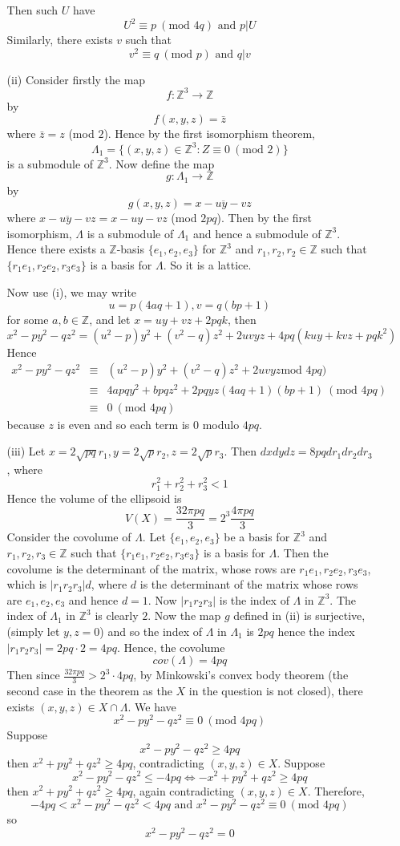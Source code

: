 \begin{enumerate}
\begin{enumerate}
    Then such $U$ have
    $$U^2 \equiv p~(\text{mod }4q) \text{ and } p|U$$
    Similarly, there exists $v$ such that
    $$v^2 \equiv q~(\text{mod } p) \text{ and } q|v$$
\item[(ii)] Consider firstly the map
$$f:\mathbb{Z}^3 \rightarrow \mathbb{Z}$$
by
$$f(x,y,z)=\bar{z}$$
where $\bar{z}= z$ (mod $2$). Hence by the first isomorphism theorem,
$$\Lambda_1=\{(x,y,z)\in \mathbb{Z}^3: Z \equiv 0~(\text{mod }2)\}$$ is
a submodule of $\mathbb{Z}^3$.
Now define the map
$$g:\Lambda_1 \rightarrow \mathbb{Z}$$
by
$$g(x,y,z)=\overline{x-uy-vz}$$
where $\overline{x-uy-vz} = x-uy-vz$ (mod $2pq$). Then by the first isomorphism,
$\Lambda$ is a submodule of $\Lambda_1$ and hence a submodule of $\mathbb{Z}^3$. Hence there exists
a $\mathbb{Z}$-basis $\{e_1,e_2,e_3\}$ for $\mathbb{Z}^3$ and $r_1,r_2,r_2 \in \mathbb{Z}$ such that
$\{r_1e_1,r_2e_2,r_3e_3\}$ is a basis for $\Lambda$. So it is a lattice.

Now use (i), we may write
$$u=p(4aq+1),v=q(bp+1)$$
for some $a,b \in \mathbb{Z}$, and let $x=uy+vz+2pqk$, then
$$x^2-py^2-qz^2=(u^2-p)y^2+(v^2-q)z^2+2uvyz+4pq(kuy+kvz+pqk^2)$$
Hence
\begin{eqnarray*}
x^2-py^2-qz^2 &\equiv& (u^2-p)y^2+(v^2-q)z^2+2uvyz \text{mod } 4pq)\\
&\equiv& 4apqy^2+bpqz^2+2pqyz(4aq+1)(bp+1)~(\text{mod }4pq)\\
&\equiv& 0~(\text{mod }4pq)
\end{eqnarray*}
because $z$ is even and so each term is $0$ modulo $4pq$.\\
\item[(iii)] Let $x=2\sqrt{pq}r_1,y=2\sqrt{p}r_2,z=2\sqrt{p}r_3$. Then $dxdydz=8pqdr_1dr_2dr_3$, where
$$r^2_1+r^2_2+r^2_3<1$$
Hence the volume of the ellipsoid is
$$V(X)=\frac{32\pi pq}{3}=2^3 \frac{4\pi pq}{3}$$
Consider the covolume of $\Lambda$. Let $\{e_1,e_2,e_3\}$ be a basis for $\mathbb{Z}^3$ and $r_1,r_2,r_3 \in\mathbb{Z}$ such that
$\{r_1e_1,r_2e_2,r_3e_3\}$ is a basis for $\Lambda$. Then the covolume is the determinant of the matrix,
whose rows are $r_1e_1,r_2e_2,r_3e_3$, which is $|r_1r_2r_3|d$, where $d$ is the determinant of the
matrix whose rows are $e_1,e_2,e_3$ and hence $d=1$.
Now $|r_1r_2r_3|$ is the index of $\Lambda$ in $\mathbb{Z}^3$. The index of $\Lambda_1$ in $\mathbb{Z}^3$ is clearly $2$. Now the map $g$ defined in (ii) is surjective, (simply let $y,z=0$) and so the index of
$\Lambda$ in $\Lambda_1$ is $2pq$ hence the index $|r_1r_2r_3|=2pq \cdot 2=4pq$. Hence, the covolume
$$cov(\Lambda)=4pq$$
Then since $\frac{32\pi pq}{3} >2^3 \cdot 4pq$, by Minkowski's convex body theorem (the second case in the theorem as the $X$ in the question is not closed), there exists $(x,y,z) \in X \cap \Lambda$.
We have
$$x^2-py^2-qz^2 \equiv 0~(\text{mod }4pq)$$
Suppose $$x^2-py^2-qz^2 \ge 4pq$$ then $x^2+py^2+qz^2 \ge 4pq$, contradicting $(x,y,z) \in X$.
Suppose $$x^2-py^2-qz^2 \le -4pq \iff -x^2+py^2+qz^2 \ge 4pq$$
then $x^2+py^2+qz^2 \ge 4pq$, again contradicting $(x,y,z) \in X$.
Therefore,
$$-4pq<x^2-py^2-qz^2<4pq \text{ and } x^2-py^2-qz^2 \equiv 0~(\text{mod } 4pq)$$
so
$$x^2-py^2-qz^2=0$$
\end{enumerate}
\end{enumerate}
